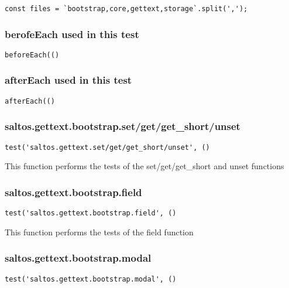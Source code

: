 \documentclass[a4paper]{article}
\begin{document}
\begin{lstlisting}
const files = `bootstrap,core,gettext,storage`.split(',');
\end{lstlisting}

\hypertarget{toc181}{}
\subsubsection{berofeEach used in this test}

\begin{lstlisting}
beforeEach(()
\end{lstlisting}

\hypertarget{toc182}{}
\subsubsection{afterEach used in this test}

\begin{lstlisting}
afterEach(()
\end{lstlisting}

\hypertarget{toc183}{}
\subsubsection{saltos.gettext.bootstrap.set/get/get\_short/unset}

\begin{lstlisting}
test('saltos.gettext.set/get/get_short/unset', ()
\end{lstlisting}

This function performs the tests of the set/get/get\_short and unset functions

\hypertarget{toc184}{}
\subsubsection{saltos.gettext.bootstrap.field}

\begin{lstlisting}
test('saltos.gettext.bootstrap.field', ()
\end{lstlisting}

This function performs the tests of the field function

\hypertarget{toc185}{}
\subsubsection{saltos.gettext.bootstrap.modal}

\begin{lstlisting}
test('saltos.gettext.bootstrap.modal', ()
\end{lstlisting}
\end{document}
